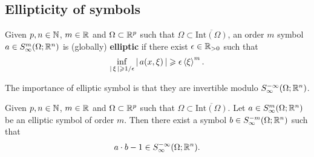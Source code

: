\documentclass{article}
\begin{document}
\subsection{Ellipticity of symbols}
\begin{fdefinition}
    Given $p, n \in \N$, $m \in \R$ and $\Omega \subset \R^p$ such that $\Omega \subset \overline{\mathrm{Int}(\Omega)}$, an order $m$ symbol $a \in S^m_\infty(\Omega; \R^n)$ is (globally) \textbf{elliptic} if there exist $\epsilon \in \R_{>0}$ such that 
    \[
        \inf_{\abs{\xi} \geq 1/\epsilon} \abs{a(x, \xi)} \geq \epsilon \sym[\xi]^m. 
    \]
\end{fdefinition}
The importance of elliptic symbol is that they are invertible modulo $S^{-\infty}_\infty(\Omega; \R^n)$. 

\begin{flemma}
    Given $p, n \in \N$, $m \in \R$ and $\Omega \subset \R^p$ such that $\Omega \subset \overline{\mathrm{Int}(\Omega)}$. Let $a \in S^m_\infty(\Omega; \R^n)$ be an elliptic symbol of order $m$. Then there exist a symbol $b \in S^{-m}_\infty(\Omega; \R^n)$ such that 
    \[
    a \cdot b - 1 \in S^{-\infty}_\infty(\Omega; \R^n). 
    \]
\end{flemma}
\end{document}
